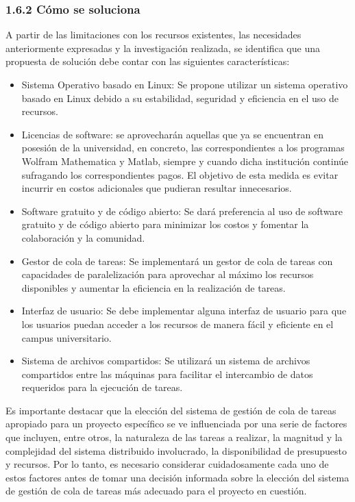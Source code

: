 \begin{spacing}{1.5}
\begin{multicols}{2}
  \subsubsection{1.6.2 Cómo se soluciona}
  A partir de las limitaciones con los recursos existentes, las necesidades anteriormente expresadas y la investigación realizada, se identifica que una propuesta de solución debe contar con las siguientes características:
  \begin{itemize}
    \item Sistema Operativo basado en Linux: Se propone utilizar un sistema operativo basado en Linux debido a su estabilidad, seguridad y eficiencia en el uso de recursos.
    \item Licencias de software: se aprovecharán aquellas que ya se encuentran en posesión de la universidad, en concreto, las correspondientes a los programas Wolfram Mathematica y Matlab, siempre y cuando dicha institución continúe sufragando los correspondientes pagos. El objetivo de esta medida es evitar incurrir en costos adicionales que pudieran resultar innecesarios.
    \item Software gratuito y de código abierto: Se dará preferencia al uso de software gratuito y de código abierto para minimizar los costos y fomentar la colaboración y la comunidad.
    \item Gestor de cola de tareas: Se implementará un gestor de cola de tareas con capacidades de paralelización para aprovechar al máximo los recursos disponibles y aumentar la eficiencia en la realización de tareas.
    \item Interfaz de usuario: Se debe implementar alguna interfaz de usuario para que los usuarios puedan acceder a los recursos de manera fácil y eficiente en el campus universitario.
    \item Sistema de archivos compartidos: Se utilizará un sistema de archivos compartidos entre las máquinas para facilitar el intercambio de datos requeridos para la ejecución de tareas.
    \end{itemize} 
    Es importante destacar que la elección del sistema de gestión de cola de tareas apropiado para un proyecto específico se ve influenciada por una serie de factores que incluyen, entre otros, la naturaleza de las tareas a realizar, la magnitud y la complejidad del sistema distribuido involucrado, la disponibilidad de presupuesto y recursos. Por lo tanto, es necesario considerar cuidadosamente cada uno de estos factores antes de tomar una decisión informada sobre la elección del sistema de gestión de cola de tareas más adecuado para el proyecto en cuestión.


\end{multicols}
\end{spacing}
